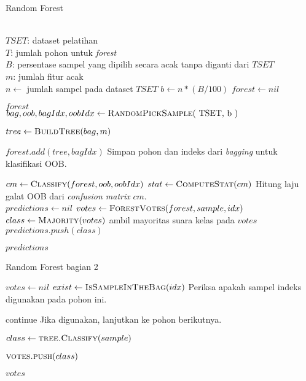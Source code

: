 \begin{algorithm}[htbp]
\caption{Random Forest}
\label{alg:rf}
	\begin{algorithmic}[1]
\Require \\
$ TSET $: dataset pelatihan \\
$ T $: jumlah pohon untuk \textit{forest} \\
$ B $: persentase sampel yang dipilih secara acak tanpa diganti dari $TSET$ \\
$ m $: jumlah fitur acak \\

	\State $ n \gets $ jumlah sampel pada dataset $ TSET $
	\State $ b \gets n * (B / 100) $
	\State $ forest \gets nil $
		\State {}
	\EndFor
	
	\State \Return $forest$
\EndFunction
\\
	\label{bagging}
	\State $ bag, oob, bagIdx, oobIdx \gets \Call{RandomPickSample}{$ TSET,
	b $} $

	\State $ tree \gets \Call{BuildTree}{bag, m} $

	\State $ forest.add(tree, bagIdx) $
	\Comment Simpan pohon dan indeks dari \textit{bagging} untuk
	klasifikasi OOB.

	\State $ cm \gets \Call{Classify}{forest, oob, oobIdx} $
	\State $ stat \gets \Call{ComputeStat}{cm} $
	\Comment Hitung laju galat OOB dari \textit{confusion matrix}
	$cm$.
\EndFunction
\\
	\State $ predictions \gets nil $
		\State $ votes \gets \Call{ForestVotes}{forest, sample, idx} $
		\State $ class \gets \Call{Majority}{votes} $
		\Comment ambil mayoritas suara kelas pada $votes$
		\State $ predictions.push(class) $
	\EndFor

	\State \Return $predictions$
\EndFunction
	\end{algorithmic}
\end{algorithm}

\begin{algorithm}[htbp]
	\caption{Random Forest bagian 2}
	\begin{algorithmic}[1]


	\State $ votes \gets nil $
		\State $ exist \gets \Call{IsSampleInTheBag}{idx} $
		\Comment Periksa apakah sampel indeks digunakan pada pohon ini.

			\State continue
			\Comment Jika digunakan, lanjutkan ke pohon berikutnya.
		\EndIf

		\State $ class \gets \Call{tree.Classify}{sample} $

		\State $ \Call{votes.push}{class} $
	\EndFor

	\State \Return $ votes $
\EndFunction
	\end{algorithmic}
\end{algorithm}

